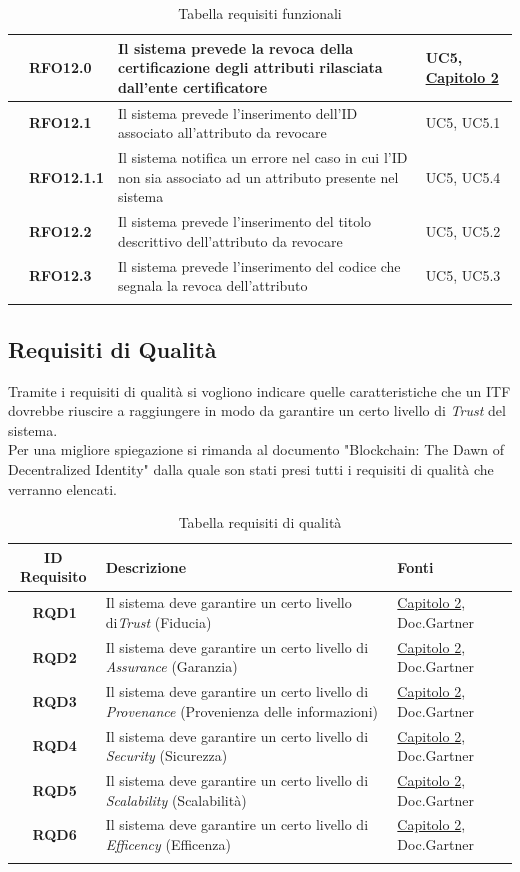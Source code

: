 \begin{longtable}{|r l|p{10cm}|p{2cm}|}
	&\textbf{RFO12.0}&Il sistema prevede la revoca della certificazione degli attributi rilasciata dall'ente certificatore&UC5, \hyperref[cap:tecnologie_e_strumenti]{Capitolo 2} \\\hline
	&\textbf{RFO12.1}&Il sistema prevede l'inserimento dell'ID associato all'attributo da revocare&UC5, UC5.1 \\\hline
	&\textbf{RFO12.1.1}&Il sistema notifica un errore nel caso in cui l'ID non sia associato ad un attributo presente nel sistema&UC5, UC5.4 \\\hline
	&\textbf{RFO12.2}&Il sistema prevede l'inserimento del titolo descrittivo dell'attributo da revocare&UC5, UC5.2 \\\hline
	&\textbf{RFO12.3}&Il sistema prevede l'inserimento del codice che segnala la revoca dell'attributo&UC5, UC5.3 \\\hline
	\caption{Tabella requisiti funzionali}
\end{longtable}
\subsection{Requisiti di Qualità}
Tramite i requisiti di qualità si vogliono indicare quelle caratteristiche che un \gls{ITF} dovrebbe riuscire a raggiungere in modo da garantire un certo livello di \textit{Trust} del sistema.\\
Per una migliore spiegazione si rimanda al documento "Blockchain: The Dawn of Decentralized Identity"\cite{ITF_gartner} dalla quale son stati presi tutti i requisiti di qualità che verranno elencati.
\begin{longtable}{|r l|p{10cm}|p{2.5cm}|}
	\hline
	\multicolumn{2}{|c|}{\textbf{ID Requisito}} & \textbf{Descrizione} & \textbf{Fonti}\tabularnewline
	\hline
	&\textbf{RQD1}&Il sistema deve garantire un certo livello di\textit{Trust} (Fiducia)& \hyperref[cap:tecnologie_e_strumenti]{Capitolo 2}, Doc.Gartner\cite{ITF_gartner}\\\hline
	&\textbf{RQD2}&Il sistema deve garantire un certo livello di \textit{Assurance} (Garanzia)& \hyperref[cap:tecnologie_e_strumenti]{Capitolo 2}, Doc.Gartner\cite{ITF_gartner}\\\hline
	&\textbf{RQD3}&Il sistema deve garantire un certo livello di \textit{Provenance} (Provenienza delle informazioni)& \hyperref[cap:tecnologie_e_strumenti]{Capitolo 2}, Doc.Gartner\cite{ITF_gartner}\\\hline
	&\textbf{RQD4}&Il sistema deve garantire un certo livello di \textit{Security} (Sicurezza)& \hyperref[cap:tecnologie_e_strumenti]{Capitolo 2}, Doc.Gartner\cite{ITF_gartner}\\\hline
	&\textbf{RQD5}&Il sistema deve garantire un certo livello di \textit{Scalability} (Scalabilità)& \hyperref[cap:tecnologie_e_strumenti]{Capitolo 2}, Doc.Gartner\cite{ITF_gartner}\\\hline
	&\textbf{RQD6}&Il sistema deve garantire un certo livello di \textit{Efficency} (Efficenza)& \hyperref[cap:tecnologie_e_strumenti]{Capitolo 2}, Doc.Gartner\cite{ITF_gartner}\\\hline
	\caption{Tabella requisiti di qualità}
\end{longtable}
